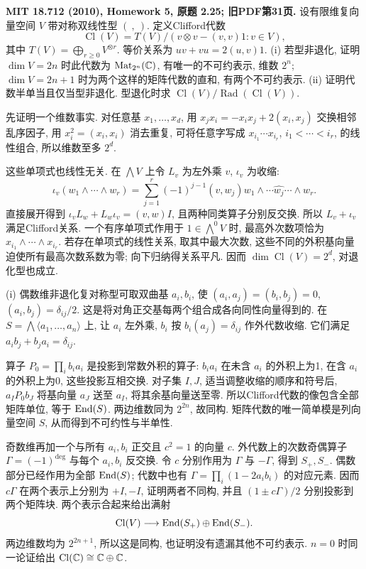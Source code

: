 \begin{exercise}\label{hw:2.25}
\textbf{MIT 18.712 (2010), Homework 5, 原题 2.25; 旧PDF第31页.}
设有限维复向量空间 $V$ 带对称双线性型 $(\ ,\ )$. 定义Clifford代数
\[
 \operatorname{Cl}(V)=T(V)/(v\otimes v-(v,v)1:v\in V),
\]
其中 $T(V)=\bigoplus_{r\ge0}V^{\otimes r}$. 等价关系为 $uv+vu=2(u,v)1$.
(i) 若型非退化, 证明 $\dim V=2n$ 时此代数为 $\operatorname{Mat}_{2^n}(\mathbb C)$, 有唯一的不可约表示, 维数 $2^n$; $\dim V=2n+1$ 时为两个这样的矩阵代数的直和, 有两个不可约表示.
(ii) 证明代数半单当且仅当型非退化. 型退化时求 $\operatorname{Cl}(V)/\operatorname{Rad}(\operatorname{Cl}(V))$.
\end{exercise}
\begin{solution}
先证明一个维数事实. 对任意基 $x_1,\ldots,x_d$, 用 $x_jx_i=-x_ix_j+2(x_i,x_j)$ 交换相邻乱序因子, 用 $x_i^2=(x_i,x_i)$ 消去重复, 可将任意字写成 $x_{i_1}\cdots x_{i_r}$, $i_1<\cdots<i_r$, 的线性组合, 所以维数至多 $2^d$.

这些单项式也线性无关. 在 $\bigwedge V$ 上令 $L_v$ 为左外乘 $v$, $\iota_v$ 为收缩:
\[
 \iota_v(w_1\wedge\cdots\wedge w_r)
 =\sum_{j=1}^r(-1)^{j-1}(v,w_j)
 w_1\wedge\cdots\widehat{w_j}\cdots\wedge w_r.
\]
直接展开得到 $\iota_vL_w+L_w\iota_v=(v,w)I$, 且两种同类算子分别反交换. 所以 $L_v+\iota_v$ 满足Clifford关系. 一个有序单项式作用于 $1\in\bigwedge^0V$ 时, 最高外次数项恰为 $x_{i_1}\wedge\cdots\wedge x_{i_r}$. 若存在单项式的线性关系, 取其中最大次数, 这些不同的外积基向量迫使所有最高次数系数为零; 向下归纳得关系平凡. 因而 $\dim\operatorname{Cl}(V)=2^d$, 对退化型也成立.

(i) 偶数维非退化复对称型可取双曲基 $a_i,b_i$, 使 $(a_i,a_j)=(b_i,b_j)=0$, $(a_i,b_j)=\delta_{ij}/2$. 这是将对角正交基每两个组合成各向同性向量得到的. 在 $S=\bigwedge\langle a_1,\ldots,a_n\rangle$ 上, 让 $a_i$ 左外乘, $b_i$ 按 $b_i(a_j)=\delta_{ij}$ 作外代数收缩. 它们满足 $a_ib_j+b_ja_i=\delta_{ij}$.

算子 $P_0=\prod_i b_ia_i$ 是投影到常数外积的算子: $b_ia_i$ 在未含 $a_i$ 的外积上为1, 在含 $a_i$ 的外积上为0, 这些投影互相交换. 对子集 $I,J$, 适当调整收缩的顺序和符号后, $a_IP_0b_J$ 将基向量 $a_J$ 送至 $a_I$, 将其余基向量送至零. 所以Clifford代数的像包含全部矩阵单位, 等于 $\operatorname{End}(S)$. 两边维数同为 $2^{2n}$, 故同构. 矩阵代数的唯一简单模是列向量空间 $S$, 从而得到不可约性与半单性.

奇数维再加一个与所有 $a_i,b_i$ 正交且 $c^2=1$ 的向量 $c$. 外代数上的次数奇偶算子 $\Gamma=(-1)^{\deg}$ 与每个 $a_i,b_i$ 反交换. 令 $c$ 分别作用为 $\Gamma$ 与 $-\Gamma$, 得到 $S_+,S_-$. 偶数部分已经作用为全部 $\operatorname{End}(S)$; 代数中也有 $\Gamma=\prod_i(1-2a_ib_i)$ 的对应元素. 因而 $c\Gamma$ 在两个表示上分别为 $+I,-I$, 证明两者不同构, 并且 $(1\pm c\Gamma)/2$ 分别投影到两个矩阵块. 两个表示合起来给出满射
\[
 \operatorname{Cl}(V)\longrightarrow\operatorname{End}(S_+)\oplus\operatorname{End}(S_-).
\]
两边维数均为 $2^{2n+1}$, 所以这是同构, 也证明没有遗漏其他不可约表示. $n=0$ 时同一论证给出 $\operatorname{Cl}(\mathbb C)\cong\mathbb C\oplus\mathbb C$.


\end{solution}

